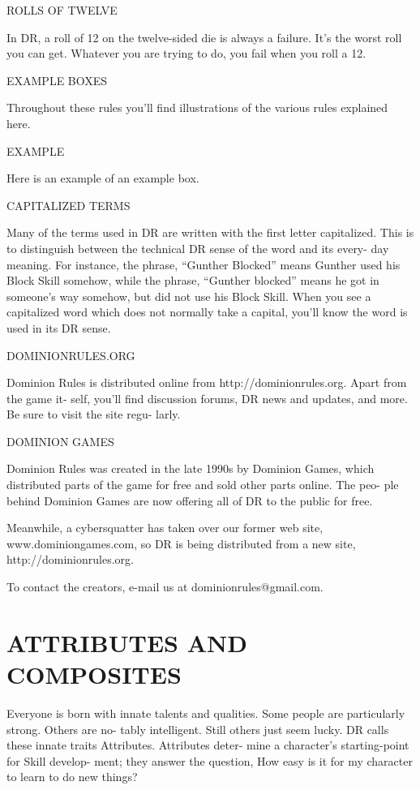 \documentclass[11pt,twocolumn]{book}
\begin{document}
ROLLS OF TWELVE

In DR, a roll of 12 on the twelve-sided die is always a failure. It’s the worst roll you can get. Whatever you are trying to do, you fail when you roll a 12.

EXAMPLE BOXES

Throughout these rules you’ll find illustrations of the various rules explained here.

\begin{mdframed}
EXAMPLE

Here is an example of an example box.
\end{mdframed}

CAPITALIZED TERMS

Many of the terms used in DR are written with the first letter capitalized. This is to distinguish between the technical DR sense of the word and its every- day meaning. For instance, the phrase, “Gunther Blocked” means Gunther used his Block Skill somehow, while the phrase, “Gunther blocked” means he got in someone’s way somehow, but did not use his Block Skill. When you see a capitalized word which does not normally take a capital, you’ll know the word is used in its DR sense.

DOMINIONRULES.ORG

Dominion Rules is distributed online from http://dominionrules.org. Apart from the game it- self, you’ll find discussion forums, DR news and updates, and more. Be sure to visit the site regu- larly.

DOMINION GAMES

Dominion Rules was created in the late 1990s by Dominion Games, which distributed parts of the game for free and sold other parts online. The peo- ple behind Dominion Games are now offering all of DR to the public for free.

Meanwhile, a cybersquatter has taken over our former web site, www.dominiongames.com, so DR is being distributed from a new site, http://dominionrules.org.

To contact the creators, e-mail us at dominionrules@gmail.com.

\chapter{ATTRIBUTES AND COMPOSITES}

Everyone is born with innate talents and qualities. Some people are particularly strong. Others are no- tably intelligent. Still others just seem lucky. DR calls these innate traits Attributes. Attributes deter- mine a character’s starting-point for Skill develop- ment; they answer the question, How easy is it for my character to learn to do new things?
\end{document}
